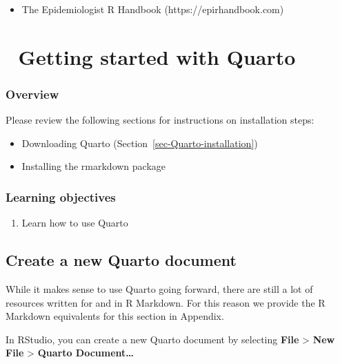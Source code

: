 \documentclass[
  letterpaper,
  DIV=11,
  numbers=noendperiod,
  oneside]{scrreprt}
\providecommand{\tightlist}{%
  \setlength{\itemsep}{0pt}\setlength{\parskip}{0pt}}\usepackage{longtable,booktabs,array}
\begin{document}
\begin{itemize}
\tightlist
\item
  The Epidemiologist R Handbook (https://epirhandbook.com)
\end{itemize}

\hypertarget{getting-started-with-quarto}{%
\chapter{\texorpdfstring{{📘} Getting started with
Quarto}{📘 Getting started with Quarto}}\label{getting-started-with-quarto}}

\hypertarget{overview-4}{%
\subsection{Overview}\label{overview-4}}

Please review the following sections for instructions on installation
steps:

\begin{itemize}
\tightlist
\item
  Downloading Quarto (Section~\ref{sec-Quarto-installation})
\item
  Installing the rmarkdown package
\end{itemize}

\hypertarget{learning-objectives-4}{%
\subsection{Learning objectives}\label{learning-objectives-4}}

\begin{enumerate}
\def\labelenumi{\arabic{enumi}.}
\tightlist
\item
  Learn how to use Quarto
\end{enumerate}

\hypertarget{create-a-new-quarto-document}{%
\section{Create a new Quarto
document}\label{create-a-new-quarto-document}}

While it makes sense to use Quarto going forward, there are still a lot
of resources written for and in R Markdown. For this reason we provide
the R Markdown equivalents for this section in Appendix.

In RStudio, you can create a new Quarto document by selecting
\textbf{File} \textgreater{} \textbf{New File} \textgreater{}
\textbf{Quarto Document\ldots{}}
\end{document}
